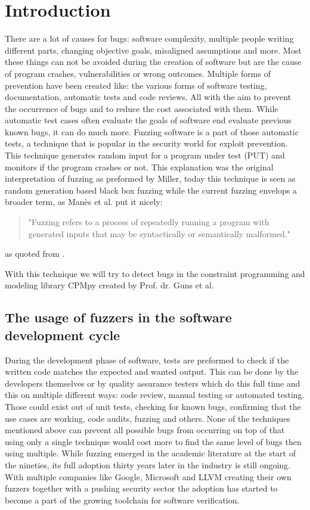 \chapter{Introduction}
\label{cha:intro}
There are a lot of causes for bugs: software complexity, multiple people writing different parts, changing objective goals, misaligned assumptions and more. Most these things can not be avoided during the creation of software but are the cause of program crashes, vulnerabilities or wrong outcomes. Multiple forms of prevention have been created like: the various forms of software testing, documentation, automatic tests and code reviews. All with the aim to prevent the occurrence of bugs and to reduce the cost associated with them. While automatic test cases often evaluate the goals of software end evaluate previous known bugs, it can do much more. Fuzzing software is a part of those automatic tests, a technique that is popular in the security world for exploit prevention. This technique generates random input for a program under test (PUT) and monitors if the program crashes or not. This explanation was the original interpretation of fuzzing as preformed by Miller\cite{4originalFuzzingUnixUtils}, today this technique is seen as random  generation based black box fuzzing while the current fuzzing envelops a broader term, as Man\`es et al.\cite{13manes2019survey} put it nicely:
\begin{quote}
"Fuzzing refers to a process of repeatedly running a program with generated inputs that may be syntactically or semantically malformed."
\end{quote} as quoted from \cite{13manes2019survey}.

With this technique we will try to detect bugs in the constraint programming and modeling library CPMpy \cite{17guns2019increasing} created by Prof. dr. Guns et al.


\section{The usage of fuzzers in the software development cycle}
During the development phase of software, tests are preformed to check if the written code matches the expected and wanted output. This can be done by the developers themselves or by quality assurance testers which do this full time and this on multiple different ways: code review, manual testing or automated testing. Those could exist out of unit tests, checking for known bugs, confirming that the use cases are working, code audits, fuzzing and others. None of the techniques mentioned above can prevent all possible bugs from occurring on top of that using only a single technique would cost more to find the same level of bugs then using multiple. While fuzzing emerged in the academic literature at the start of the nineties, its full adoption thirty years later in the industry is still ongoing. With multiple companies like Google, Microsoft and LLVM creating their own fuzzers together with a pushing security sector the adoption has started to become a part of the growing toolchain for software verification.

